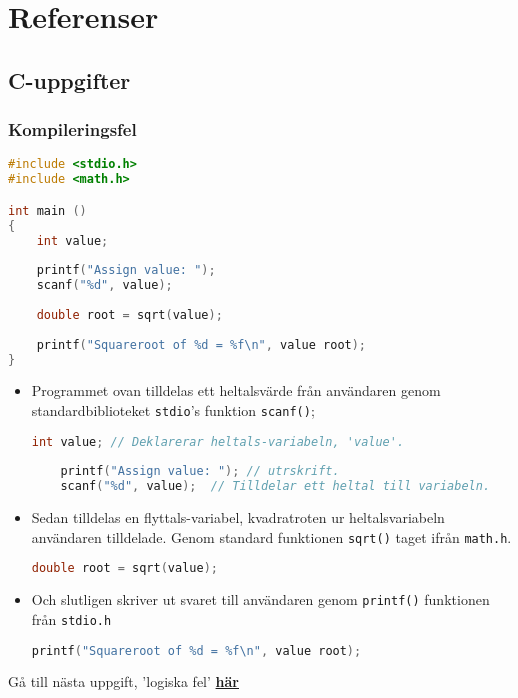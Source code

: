 \documentclass[../main.tex]{subfiles}
\begin{document}
\section{Referenser}

\subsection{C-uppgifter}

\subsubsection{Kompileringsfel}
\label{sec:compile}
\begin{lstlisting}[language=c]
#include <stdio.h>
#include <math.h>

int main ()
{
    int value;
    
    printf("Assign value: ");
    scanf("%d", value); 
    
    double root = sqrt(value);
    
    printf("Squareroot of %d = %f\n", value root);
}
\end{lstlisting}

\begin{itemize}

    \item Programmet ovan tilldelas ett heltalsvärde från användaren genom standardbiblioteket \texttt{stdio}'s funktion \texttt{scanf()};
    
    \begin{lstlisting}[language=c]
    int value; // Deklarerar heltals-variabeln, 'value'.
    
    printf("Assign value: "); // utrskrift.
    scanf("%d", value);  // Tilldelar ett heltal till variabeln.
    \end{lstlisting}
    
    \item Sedan tilldelas en flyttals-variabel, kvadratroten ur heltalsvariabeln användaren tilldelade. Genom standard funktionen \texttt{sqrt()} taget ifrån \texttt{math.h}.
    
    \begin{lstlisting}[language=c]
    double root = sqrt(value);
    \end{lstlisting}
    
    \item Och slutligen skriver ut svaret till användaren genom \texttt{printf()} funktionen från \texttt{stdio.h}
    
    \begin{lstlisting}[language=c]
     printf("Squareroot of %d = %f\n", value root);
    \end{lstlisting}
\end{itemize}

\begin{tcolorbox}[colback=green!5!white,colframe=green!75!black]
  Gå till nästa uppgift, 'logiska fel' \hyperref[sec:c2]{\textbf{här}}
\end{tcolorbox}
\end{document}
